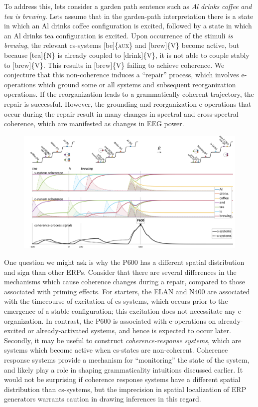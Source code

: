   To address this, lets consider a garden path sentence such as \textit{Al} \textit{drinks} \textit{coffee} \textit{and} \textit{tea} \textit{is} \textit{brewing}. Lets assume that in the garden-path interpretation there is a state in which an {\textbar}Al drinks coffee{\textbar} configuration is excited, followed by a state in which an {\textbar}Al drinks tea{\textbar} configuration is excited. Upon occurrence of the stimuli \textit{is} \textit{brewing}, the relevant cs-systems [be]\{\textsc{aux}\} and [brew]\{V\} become active, but because [tea]\{N\} is already coupled to [drink]\{V\}, it is not able to couple stably to [brew]\{V\}. This results in [brew]\{V\} failing to achieve coherence. We conjecture that this non-coherence induces a “repair” process, which involves e-operations which ground some or all systems and subsequent reorganization operations. If the reorganization leads to a grammatically coherent trajectory, the repair is successful. However, the grounding and reorganization e-operations that occur during the repair result in many changes in spectral and cross-spectral coherence, which are manifested as changes in EEG power. 

  
\begin{figure}
\includegraphics[width=\textwidth]{figures/Tilsen-img144.png}
\caption{\missingcaption}
\label{fig:}
\end{figure}
 

One question we might ask is why the P600 has a different spatial distribution and sign than other ERPs. Consider that there are several differences in the mechanisms which cause coherence changes during a repair, compared to those associated with priming effects. For starters, the ELAN and N400 are associated with the timecourse of excitation of cs-systems, which occurs prior to the emergence of a stable configuration; this excitation does not necessitate any e-organization. In contrast, the P600 is associated with e-operations on already-excited or already-activated systems, and hence is expected to occur later. Secondly, it may be useful to construct \textit{coherence-response} \textit{systems}, which are systems which become active when cs-states are non-coherent. Coherence response systems provide a mechanism for “monitoring” the state of the system, and likely play a role in shaping grammaticality intuitions discussed earlier. It would not be surprising if coherence response systems have a different spatial distribution than cs-systems, but the imprecision in spatial localization of ERP generators warrants caution in drawing inferences in this regard.

